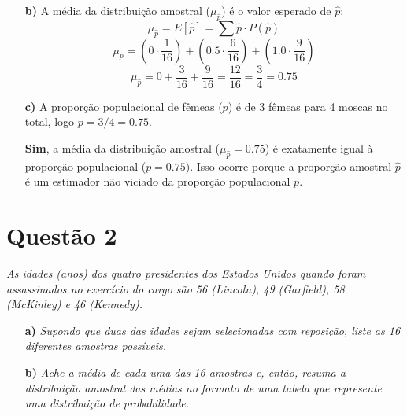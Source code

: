 \documentclass[12pt, a4paper]{article}
\begin{document}
\begin{itemize}
    \item[\textbf{b)}] A média da distribuição amostral ($\mu_{\hat{p}}$) é o valor esperado de $\hat{p}$:
    $$ \mu_{\hat{p}} = E[\hat{p}] = \sum \hat{p} \cdot P(\hat{p}) $$
    $$ \mu_{\hat{p}} = \left(0 \cdot \frac{1}{16}\right) + \left(0.5 \cdot \frac{6}{16}\right) + \left(1.0 \cdot \frac{9}{16}\right) $$
    $$ \mu_{\hat{p}} = 0 + \frac{3}{16} + \frac{9}{16} = \frac{12}{16} = \frac{3}{4} = 0.75 $$

    \item[\textbf{c)}] A proporção populacional de fêmeas ($p$) é de 3 fêmeas para 4 moscas no total, logo $p = 3/4 = 0.75$.
    
    \textbf{Sim}, a média da distribuição amostral ($\mu_{\hat{p}} = 0.75$) é exatamente igual à proporção populacional ($p = 0.75$). Isso ocorre porque a proporção amostral $\hat{p}$ é um estimador não viciado da proporção populacional $p$.
\end{itemize}

\newpage

\section*{Questão 2}
\textit{As idades (anos) dos quatro presidentes dos Estados Unidos quando foram assassinados no exercício do cargo são 56 (Lincoln), 49 (Garfield), 58 (McKinley) e 46 (Kennedy).}
\begin{itemize}
    \item[\textbf{a)}] \textit{Supondo que duas das idades sejam selecionadas com reposição, liste as 16 diferentes amostras possíveis.}
    \item[\textbf{b)}] \textit{Ache a média de cada uma das 16 amostras e, então, resuma a distribuição amostral das médias no formato de uma tabela que represente uma distribuição de probabilidade.}
\end{itemize}
\end{document}
